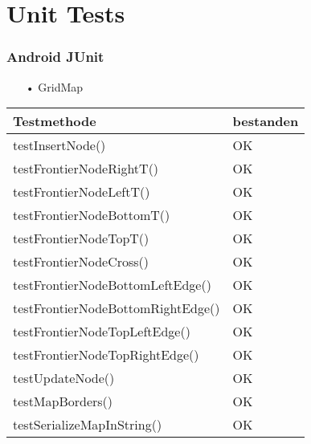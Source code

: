 \documentclass[xcolor=dvipsnames]{beamer}
\begin{document}
\section{Unit Tests}
	\begin{frame}
	\frametitle{Android JUnit}
		\begin{itemize}
			\item[•]GridMap
		\end{itemize}
				            \begin{tabular}{l|p{2cm}}
				\hline
					\textbf{Testmethode} & \textbf{bestanden}\\
				\hline \hline
					 testInsertNode() & OK \\
 				\hline
					testFrontierNodeRightT() & OK \\
				\hline		
					testFrontierNodeLeftT() & OK \\
				\hline		
					testFrontierNodeBottomT() & OK \\
				\hline	
					testFrontierNodeTopT() & OK \\
				\hline	
					testFrontierNodeCross() & OK \\
				\hline	
					testFrontierNodeBottomLeftEdge() & OK \\
				\hline	
					testFrontierNodeBottomRightEdge() & OK \\
				\hline	
					testFrontierNodeTopLeftEdge() & OK \\
				\hline	
					testFrontierNodeTopRightEdge() & OK \\
				\hline	
					testUpdateNode() & OK \\
				\hline	
					testMapBorders() & OK \\
				\hline	
					testSerializeMapInString() & OK \\
				\hline	
			\end{tabular}
	\end{frame}
	
\end{document}
